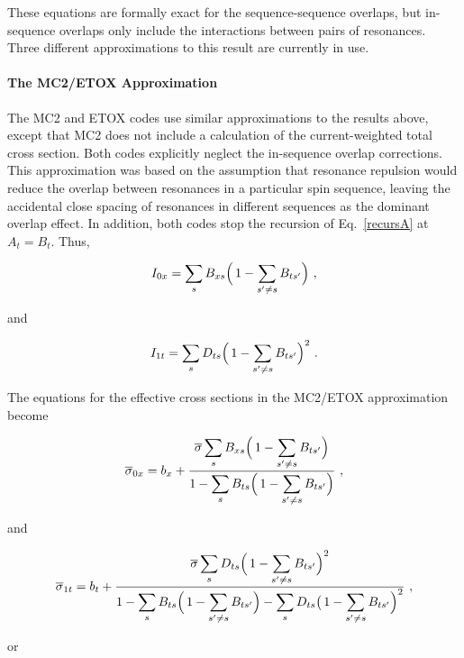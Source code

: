 These equations are formally exact for the sequence-sequence overlaps,
but in-sequence overlaps only include the interactions between
pairs of resonances.  Three different approximations to this
result are currently in use.


\paragraph{The MC2/ETOX Approximation}
The MC2 and ETOX codes use similar
approximations to the results above, except that MC2 does not
include a calculation of the current-weighted total cross section.
Both codes explicitly neglect the in-sequence overlap corrections.
This approximation was based on the assumption that resonance
repulsion would reduce the overlap between resonances in a
particular spin sequence, leaving the accidental close spacing
of resonances in different sequences as the dominant overlap
effect.  In addition, both codes stop the recursion of
Eq.~\ref{recursA} at $A_t=B_t$.  Thus,

\begin{equation}
  I_{0x} = \sum_s B_{xs} \Bigl(\,1-\sum_{s'\neq s} B_{ts'}\Bigr)\,\,,
\end{equation}

\noindent
and

\begin{equation}
  I_{1t} = \sum_s D_{ts}\Bigl(\,1-\sum_{s'\neq s}B_{ts'}\Bigr)^2\,\,.
\label{I1t}
\end{equation}

\noindent
The equations for the effective cross sections in the MC2/ETOX
approximation become

\begin{equation}
  \overline{\sigma}_{0x} = b_x + \frac{\displaystyle\overline{\sigma}
   \sum_s B_{xs} \Bigl(\,1-\sum_{s'\neq s}B_{ts'}\Bigr)}
    {\displaystyle 1-\sum_s B_{ts} \Bigl(\,1-\sum_{s'\neq s}B_{ts'}\Bigr)}\,\,,
\label{sb0x}
\end{equation}

\noindent
and

\begin{equation}
  \overline{\sigma}_{1t} = b_t + \frac{\displaystyle\overline{\sigma}
   \sum_s D_{ts} \Bigl(\,1-\sum_{s'\neq s}B_{ts'}\Bigr)^2}
    {\displaystyle 1-\sum_s B_{ts} \Bigl(\,1-\sum_{s'\neq s}B_{ts'}\Bigr)
     -\sum_s D_{ts}\bigl(\,1-\sum_{s'\neq s}B_{ts'}\Bigr)^2}\,\,,
\end{equation}

\noindent
or

